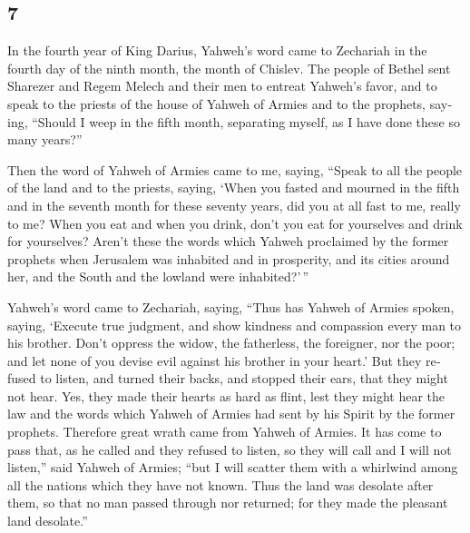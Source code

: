 \begin{paracol}{2}
\switchcolumn
\begin{otherlanguage}{english}

\hypertarget{section-13}{%
\section{7}\label{section-13}}

 In the fourth year of King Darius, Yahweh's word came to
Zechariah in the fourth day of the ninth month, the month of Chislev.
 The people of Bethel sent Sharezer and Regem Melech and
their men to entreat Yahweh's favor,  and to speak to the
priests of the house of Yahweh of Armies and to the prophets, saying,
``Should I weep in the fifth month, separating myself, as I have done
these so many years?''

 Then the word of Yahweh of Armies came to me, saying,
 ``Speak to all the people of the land and to the priests,
saying, `When you fasted and mourned in the fifth and in the seventh
month for these seventy years, did you at all fast to me, really to me?
 When you eat and when you drink, don't you eat for
yourselves and drink for yourselves?  Aren't these the
words which Yahweh proclaimed by the former prophets when Jerusalem was
inhabited and in prosperity, and its cities around her, and the South
and the lowland were inhabited?'\,''

 Yahweh's word came to Zechariah, saying, 
``Thus has Yahweh of Armies spoken, saying, `Execute true judgment, and
show kindness and compassion every man to his brother. 
Don't oppress the widow, the fatherless, the foreigner, nor the poor;
and let none of you devise evil against his brother in your heart.'
 But they refused to listen, and turned their backs, and
stopped their ears, that they might not hear.  Yes, they
made their hearts as hard as flint, lest they might hear the law and the
words which Yahweh of Armies had sent by his Spirit by the former
prophets. Therefore great wrath came from Yahweh of Armies.
 It has come to pass that, as he called and they refused
to listen, so they will call and I will not listen,'' said Yahweh of
Armies;  ``but I will scatter them with a whirlwind among
all the nations which they have not known. Thus the land was desolate
after them, so that no man passed through nor returned; for they made
the pleasant land desolate.''


\end{otherlanguage}
\end{paracol}
